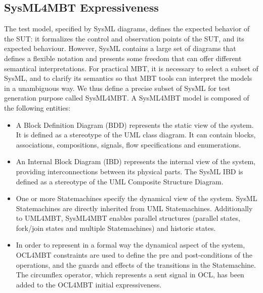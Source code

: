 \documentclass{llncs}
\begin{document}
\subsection{SysML4MBT Expressiveness}

The test model, specified by SysML diagrams, defines the expected
behavior of the SUT: it formalizes the control and observation points 
of the SUT, and its expected behaviour. However, SysML contains a
large set of diagrams that defines a flexible notation and presents 
some freedom that can offer different semantical
interpretations. For practical MBT, it is necessary to select a
subset of SysML, and to clarify its semantics so that MBT tools can
interpret the models in a unambiguous way. We thus define a precise
subset of SysML for test generation purpose called SysML4MBT. A 
SysML4MBT model is composed of the following entities:  
\begin{itemize}
\vspace*{-.25cm}
  \item A Block Definition Diagram (BDD) represents the static view of the
  system. It is defined as a stereotype of the UML class
  diagram. It can contain blocks, associations, compositions, signals,
  flow specifications and enumerations. 
  \item An Internal Block Diagram (IBD) represents the internal view of the
  system, providing interconnections between its physical parts. The SysML IBD is
  defined as a stereotype of the UML Composite Structure Diagram.
  \item One or more Statemachines specify the dynamical view of the
    system. SysML Statemachines are directly inherited from UML
    Statemachines. Additionally to UML4MBT, SysML4MBT enables parallel
    structures (parallel states, fork/join states and multiple
    Statemachines) and historic states. 
  \item In order to represent in a formal way the dynamical aspect of
    the system, OCL4MBT constraints are used to define the pre and
    post-conditions of the operations, and the guards and effects of
    the transitions in the Statemachine. The circumflex operator,
    which represents a sent signal in OCL, has been added to the
    OCL4MBT initial expressiveness.  
\end{itemize}
\vspace*{-.4cm}
\end{document}
